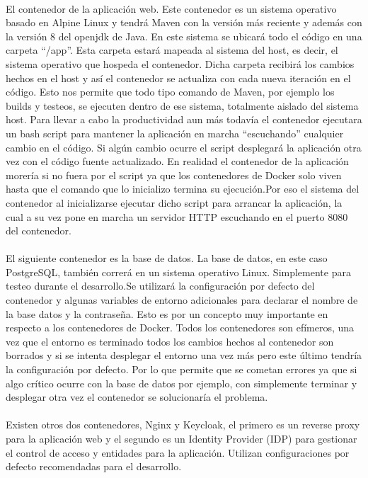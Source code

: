 \paragraph{}
El contenedor de la aplicación web. Este contenedor es un sistema
operativo basado en Alpine Linux y tendrá Maven con la versión más
reciente y además con la versión 8 del openjdk de Java. En este
sistema se ubicará todo el código en una carpeta “/app”. Esta carpeta
estará mapeada al sistema del host, es decir, el sistema operativo que
hospeda el contenedor. Dicha carpeta recibirá los cambios hechos en el
host y así el contenedor se actualiza con cada nueva iteración en el
código. Esto nos permite que todo tipo comando de Maven, por ejemplo
los builds y testeos, se ejecuten dentro de ese sistema, totalmente
aislado del sistema host.  Para llevar a cabo la productividad aun más
todavía el contenedor ejecutara un bash script para mantener la
aplicación en marcha “escuchando” cualquier cambio en el código. Si
algún cambio ocurre el script desplegará la aplicación otra vez con el
código fuente actualizado. En realidad el contenedor de la aplicación
morería si no fuera por el script ya que los contenedores de Docker
solo viven hasta que el comando que lo inicializo termina su
ejecución.Por eso el sistema del contenedor al inicializarse ejecutar
dicho script para arrancar la aplicación, la cual a su vez pone en
marcha un servidor HTTP escuchando en el puerto 8080 del contenedor.

\paragraph{}
El siguiente contenedor es la base de datos. La base de datos, en este
caso PostgreSQL, también correrá en un sistema operativo
Linux. Simplemente para testeo durante el desarrollo.Se utilizará la
configuración por defecto del contenedor y algunas variables de
entorno adicionales para declarar el nombre de la base datos y la
contraseña. Esto es por un concepto muy importante en respecto a los
contenedores de Docker. Todos los contenedores son efímeros, una vez
que el entorno es terminado todos los cambios hechos al contenedor son
borrados y si se intenta desplegar el entorno una vez más pero este
último tendría la configuración por defecto. Por lo que permite que se
cometan errores ya que si algo crítico ocurre con la base de datos por
ejemplo, con simplemente terminar y desplegar otra vez el contenedor
se solucionaría el problema.

\paragraph{}
Existen otros dos contenedores, Nginx y Keycloak, el primero es un
reverse proxy para la aplicación web y el segundo es un Identity
Provider (IDP) para gestionar el control de acceso y entidades para la
aplicación. Utilizan configuraciones por defecto recomendadas para el
desarrollo.


